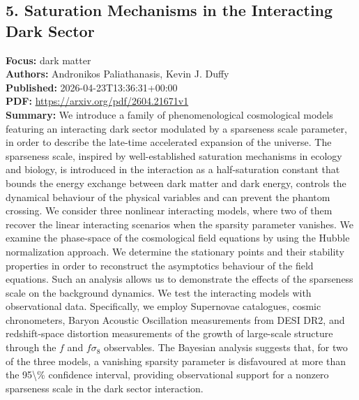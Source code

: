 \documentclass[11pt]{article}
\begin{document}
\subsection*{5. Saturation Mechanisms in the Interacting Dark Sector}
\textbf{Focus:} dark matter\\
\textbf{Authors:} Andronikos Paliathanasis, Kevin J. Duffy\\
\textbf{Published:} 2026-04-23T13:36:31+00:00\\
\textbf{PDF:} \href{https://arxiv.org/pdf/2604.21671v1}{https://arxiv.org/pdf/2604.21671v1}\\
\textbf{Summary:}
We introduce a family of phenomenological cosmological models featuring an interacting dark sector modulated by a sparseness scale parameter, in order to describe the late-time accelerated expansion of the universe. The sparseness scale, inspired by well-established saturation mechanisms in ecology and biology, is introduced in the interaction as a half-saturation constant that bounds the energy exchange between dark matter and dark energy, controls the dynamical behaviour of the physical variables and can prevent the phantom crossing. We consider three nonlinear interacting models, where two of them recover the linear interacting scenarios when the sparsity parameter vanishes. We examine the phase-space of the cosmological field equations by using the Hubble normalization approach. We determine the stationary points and their stability properties in order to reconstruct the asymptotics behaviour of the field equations. Such an analysis allows us to demonstrate the effects of the sparseness scale on the background dynamics. We test the interacting models with observational data. Specifically, we employ Supernovae catalogues, cosmic chronometers, Baryon Acoustic Oscillation measurements from DESI DR2, and redshift-space distortion measurements of the growth of large-scale structure through the $f$ and $f\sigma _8$ observables. The Bayesian analysis suggests that, for two of the three models, a vanishing sparsity parameter is disfavoured at more than the 95\textbackslash{}\% confidence interval, providing observational support for a nonzero sparseness scale in the dark sector interaction.
\newpage
\end{document}
